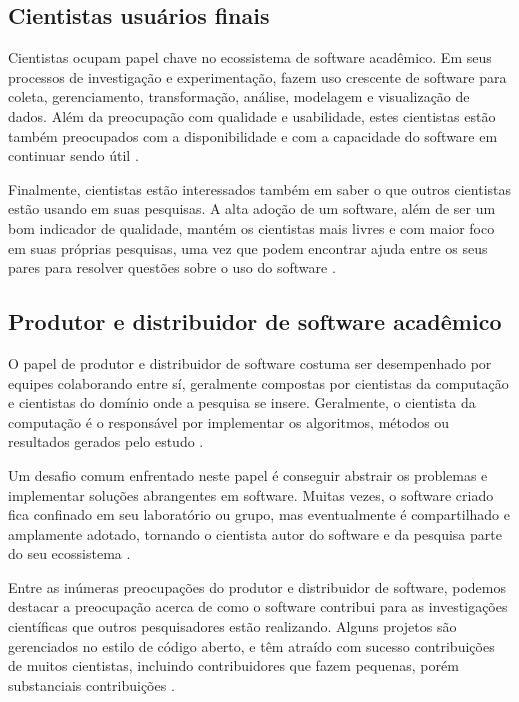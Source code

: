 \subsection{Cientistas usuários finais}

Cientistas ocupam papel chave no ecossistema de software acadêmico.  Em seus
processos de investigação e experimentação, fazem uso crescente de software
para coleta, gerenciamento, transformação, análise, modelagem e visualização de
dados. Além da preocupação com qualidade e usabilidade, estes cientistas estão
também preocupados com a disponibilidade e com a capacidade do software em
continuar sendo útil \cite{howison2015understanding}.

Finalmente, cientistas estão interessados também em saber o que outros
cientistas estão usando em suas pesquisas. A alta adoção de um software, além
de ser um bom indicador de qualidade, mantém os cientistas mais livres e com
maior foco em suas próprias pesquisas, uma vez que podem encontrar ajuda entre
os seus pares para resolver questões sobre o uso do software
\cite{howison2015understanding}.



\subsection{Produtor e distribuidor de software acadêmico}

O papel de produtor e distribuidor de software costuma ser desempenhado por
equipes colaborando entre sí, geralmente compostas por cientistas da computação
e cientistas do domínio onde a pesquisa se insere.
Geralmente, o cientista da computação é o responsável por implementar os
algoritmos, métodos ou resultados gerados pelo estudo
\cite{howison2015understanding}.

Um desafio comum enfrentado neste papel é conseguir abstrair os problemas e
implementar soluções abrangentes em software.
Muitas vezes, o software criado fica confinado em seu laboratório ou grupo, mas
eventualmente é compartilhado e amplamente adotado, tornando o cientista autor
do software e da pesquisa parte do seu ecossistema \cite{howison2015understanding}.

Entre as inúmeras preocupações do produtor e distribuidor de software, podemos
destacar a preocupação acerca de como o software contribui para as
investigações científicas que outros pesquisadores estão realizando.
Alguns projetos são gerenciados no estilo de código aberto, e têm atraído com
sucesso contribuições de muitos cientistas, incluindo contribuidores que
fazem pequenas, porém substanciais contribuições
\cite{howison2015understanding}.

